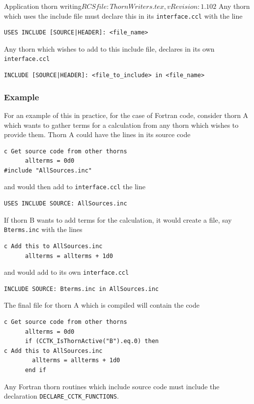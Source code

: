 \begin{cactuspart}{2}{Application thorn writing}{$RCSfile: ThornWriters.tex,v $}{$Revision: 1.102 $}
Any thorn
which uses the include file must declare this in its
{\tt interface.ccl} with the line

\begin{verbatim}
USES INCLUDE [SOURCE|HEADER]: <file_name>
\end{verbatim}

Any thorn which wishes to add to this include file,
declares in its own {\tt interface.ccl}

\begin{verbatim}
INCLUDE [SOURCE|HEADER]: <file_to_include> in <file_name>
\end{verbatim}

\subsubsection{Example}

For an example of this in practice, for the case of Fortran code,
consider thorn A which
wants to gather terms for a calculation from any thorn
which wishes to provide them. Thorn A could have
the lines in its source code

\begin{verbatim}
c Get source code from other thorns
      allterms = 0d0
#include "AllSources.inc"
\end{verbatim}
and would then add to {\tt interface.ccl} the line
\begin{verbatim}
USES INCLUDE SOURCE: AllSources.inc
\end{verbatim}

If thorn B wants to add terms for the calculation, it would
create a file, say {\tt Bterms.inc} with the lines
\begin{verbatim}
c Add this to AllSources.inc
      allterms = allterms + 1d0
\end{verbatim}
and would add to its own {\tt interface.ccl}

\begin{verbatim}
INCLUDE SOURCE: Bterms.inc in AllSources.inc
\end{verbatim}

The final file for thorn A  which is compiled will contain the code
\begin{verbatim}
c Get source code from other thorns
      allterms = 0d0
      if (CCTK_IsThornActive("B").eq.0) then
c Add this to AllSources.inc
        allterms = allterms + 1d0
      end if
\end{verbatim}

Any Fortran thorn routines which include source code must include
the declaration {\tt DECLARE\_CCTK\_FUNCTIONS}.



\end{cactuspart}
